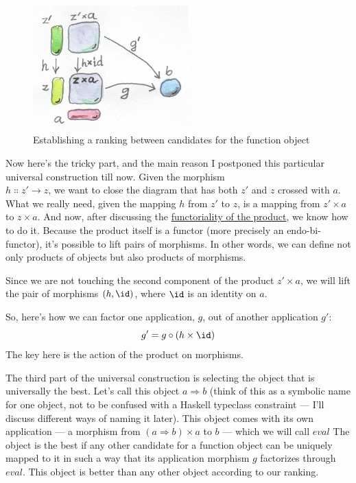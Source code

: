 \begin{figure}
\centering
\includegraphics[width=60mm]{images/functionranking.jpg}
\caption{Establishing a ranking between candidates for the function object}
\end{figure}

Now here's the tricky part, and the main reason I postponed this
particular universal construction till now. Given the morphism\\
$h \Colon z'\to z$, we want to close the diagram
that has both $z'$ and $z$ crossed with $a$.
What we really need, given the mapping $h$ from $z'$
to $z$, is a mapping from $z' \times a$ to $z \times a$.
And now, after discussing the \hyperref[functoriality]{functoriality
of the product}, we know how to do it. Because the product itself is a
functor (more precisely an endo-bi-functor), it's possible to lift pairs
of morphisms. In other words, we can define not only products of objects
but also products of morphisms.

Since we are not touching the second component of the product
$z' \times a$, we will lift the pair of morphisms
$(h, \id)$, where $\id$ is an identity on $a$.

So, here's how we can factor one application, $g$, out of another
application $g'$:
\[g' = g \circ (h \times \id)\]
The key here is the action of the product on morphisms.

The third part of the universal construction is selecting the object
that is universally the best. Let's call this object $a \Rightarrow b$ (think
of this as a symbolic name for one object, not to be confused with a
Haskell typeclass constraint --- I'll discuss different ways of naming
it later). This object comes with its own application --- a morphism
from $(a \Rightarrow b) \times a$ to $b$ --- which we will call
$eval$ The object  is the best if any other
candidate for a function object can be uniquely mapped to it in such a
way that its application morphism $g$ factorizes through
$eval$. This object is better than any other object according to
our ranking.

